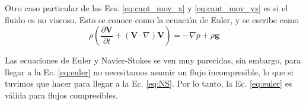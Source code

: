 Otro caso particular de las Ecs. \eqref{eq:cant_mov_x} y \eqref{eq:cant_mov_yz} es si el fluido es no viscoso.
Esto se conoce como la ecuación de Euler, y se escribe como
%
\begin{equation}\label{eq:euler}
\rho\left(\frac{\partial \mathbf{V}}{\partial t} + (\mathbf{V}\cdot\nabla)\mathbf{V} \right) = -\nabla p + \rho \mathbf{g} 
\end{equation}

Las ecuaciones de Euler y Navier-Stokes se ven muy parecidas, sin embargo, para llegar a la Ec. \eqref{eq:euler} no necesitamos asumir un flujo incompresible, lo que si tuvimos que hacer para llegar a la Ec. \eqref{eq:NS}.
Por lo tanto, la Ec. \eqref{eq:euler} es válida para flujos compresibles.
